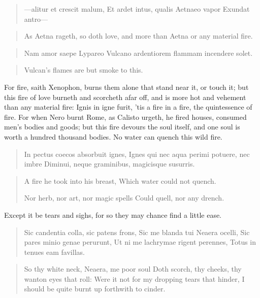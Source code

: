 \begin{latin}
\begin{verse}
---alitur et crescit malum,
Et ardet intus, qualis Aetnaeo vapor
Exundat antro---
\end{verse}
\end{latin}
\translationrule%
\begin{verse}%
As Aetna rageth, so doth love, and more than Aetna or any material
fire.
\end{verse}%

\begin{latin}
\begin{verse}
Nam amor saepe Lypareo
Vulcano ardentiorem flammam incendere solet.
\end{verse}
\end{latin}
\translationrule%
\begin{verse}%
Vulcan's flames are but smoke to this.
\end{verse}%

For fire, saith Xenophon,
burns them alone that stand near it, or touch it; but this fire of love
burneth and scorcheth afar off, and is more hot and vehement than any
material fire: Ignis in igne furit, 'tis a fire in a fire, the
quintessence of fire. For when Nero burnt Rome, as Calisto urgeth, he
fired houses, consumed men's bodies and goods; but this fire devours
the soul itself, and one soul is worth a hundred thousand bodies.
No water can quench this wild fire.

\begin{latin}
\begin{verse}
In pectus coecos absorbuit ignes,
Ignes qui nec aqua perimi potuere, nec imbre
Diminui, neque graminibus, magicisque susurris.
\end{verse}
\end{latin}
\translationrule%
\begin{verse}%
A fire he took into his breast,
Which water could not quench.

Nor herb, nor art, nor magic spells
Could quell, nor any drench.
\end{verse}%

Except it be tears and sighs, for so they may chance find a little
ease.

\begin{latin}
\begin{verse}
Sic candentia colla, sic patens frons,
Sic me blanda tui Neaera ocelli,
Sic pares minio genae perurunt,
Ut ni me lachrymae rigent perennes,
Totus in tenues eam favillas.
\end{verse}
\end{latin}
\translationrule%
\begin{verse}%
So thy white neck, Neaera, me poor soul
Doth scorch, thy cheeks, thy wanton eyes that roll:
Were it not for my dropping tears that hinder,
I should be quite burnt up forthwith to cinder.
\end{verse}%

